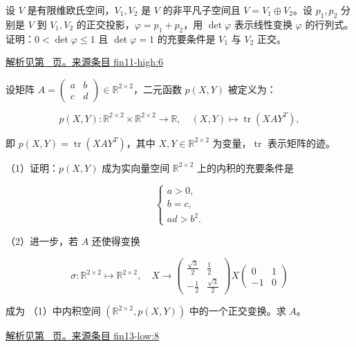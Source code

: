 \documentclass[12pt,fontset=fandol]{ctexart}
\begin{document}
\begin{example}\label{ex:fin11-high:6}

设 $V$ 是有限维欧氏空间，$V_{1}, V_{2}$ 是 $V$ 的非平凡子空间且 $V = V_{1} \oplus V_{2}$。设 $p_{1}, p_{2}$ 分别是 $V$ 到 $V_{1}, V_{2}$ 的正交投影，$\varphi = p_{1} + p_{2}$，用 $\det \varphi$ 表示线性变换 $\varphi$ 的行列式。证明：$0 < \det\varphi \leq 1$ 且 $\det\varphi = 1$ 的充要条件是 $V_{1}$ 与 $V_{2}$ 正交。

\par\hyperref[ans:fin11-high:6]{解析见第~\pageref{ans:fin11-high:6} 页。}\quad\href{https://github.com/lzxcr/cmc-mathematics/blob/64916fa1fdbc3e444a652eca204d5669058ee321/src/problems/finals/11/06.md}{来源条目 fin11-high:6}

\end{example}

\begin{example}\label{ex:fin13-low:8}

设矩阵 $A = \begin{pmatrix} a & b \\ c & d \end{pmatrix} \in \mathbb{R}^{2 \times 2}$，二元函数 $p(X, Y)$ 被定义为：

\[
p(X, Y) : \mathbb{R}^{2 \times 2} \times \mathbb{R}^{2 \times 2} \rightarrow \mathbb{R}, \quad (X, Y) \mapsto \operatorname{tr}\left(X A Y^{T}\right),
\]

即 $p(X, Y) = \operatorname{tr}\left(X A Y^{T}\right)$，其中 $X, Y \in \mathbb{R}^{2 \times 2}$ 为变量，$\operatorname{tr}$ 表示矩阵的迹。

（1）证明：$p(X, Y)$ 成为实向量空间 $\mathbb{R}^{2 \times 2}$ 上的内积的充要条件是

\[
\begin{cases} a > 0, \\ b = c, \\ ad > b^{2}. \end{cases}
\]

（2）进一步，若 $A$ 还使得变换

\[
\sigma : \mathbb{R}^{2 \times 2} \mapsto \mathbb{R}^{2 \times 2}, \quad X \rightarrow \begin{pmatrix} \frac{\sqrt{3}}{2} & \frac{1}{2} \\ -\frac{1}{2} & \frac{\sqrt{3}}{2} \end{pmatrix} X \begin{pmatrix} 0 & 1 \\ -1 & 0 \end{pmatrix}
\]

成为 （1）中内积空间 $\left(\mathbb{R}^{2 \times 2}, p(X, Y)\right)$ 中的一个正交变换。求 $A$。

\par\hyperref[ans:fin13-low:8]{解析见第~\pageref{ans:fin13-low:8} 页。}\quad\href{https://github.com/lzxcr/cmc-mathematics/blob/64916fa1fdbc3e444a652eca204d5669058ee321/src/problems/finals/13/08.md}{来源条目 fin13-low:8}

\end{example}
\end{document}
